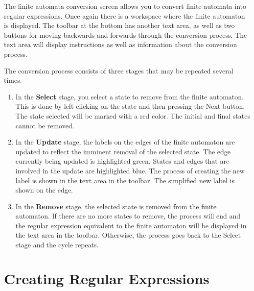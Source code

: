 \documentclass[12pt]{report}
\begin{document}
The finite automata conversion screen allows you to convert finite automata into
regular expressions. Once again there is a workspace where the finite automaton
is displayed. The toolbar at the bottom has another text area, as well as two
buttons for moving backwards and forwards through the conversion process. The
text area will display instructions as well as information about the conversion
process.

The conversion process consists of three stages that may be repeated several
times.

\begin{enumerate}
    \item In the \textbf{Select} stage, you select a state to remove from the
    finite automaton. This is done by left-clicking on the state and then
    pressing the Next button. The state selected will be marked with a red
    color. The initial and final states cannot be removed.
    \item In the \textbf{Update} stage, the labels on the edges of the finite
    automaton are updated to reflect the imminent removal of the selected state.
    The edge currently being updated is highlighted green. States and edges that
    are involved in the update are highlighted blue. The process of creating the
    new label is shown in the text area in the toolbar. The simplified new label
    is shown on the edge.
    \item In the \textbf{Remove} stage, the selected state is removed from the
    finite automaton. If there are no more states to remove, the process will
    end and the regular expression equivalent to the finite automaton will be
    displayed in the text area in the toolbar. Otherwise, the process goes back
    to the Select stage and the cycle repeats.
\end{enumerate}

\section{Creating Regular Expressions} \label{CreatingRegularExpressions}
\end{document}
